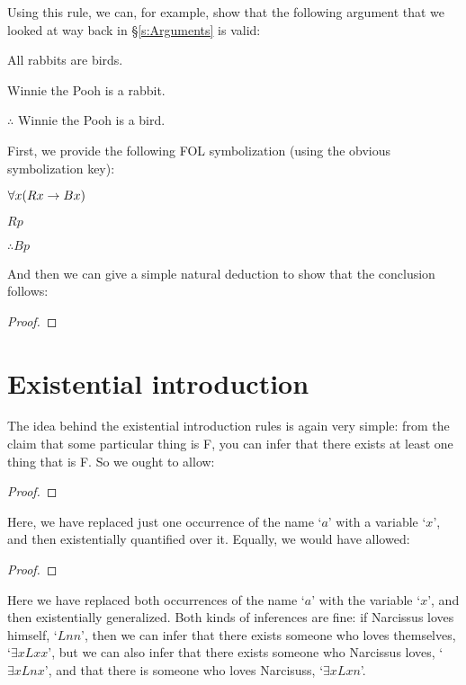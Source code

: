 Using this rule, we can, for example, show that the following argument that we looked at way back in \S\ref{s:Arguments} is valid:
\begin{earg}
\item[]All rabbits are birds.
\item[] Winnie the Pooh is a rabbit.
\item[] $\therefore$ Winnie the Pooh is a bird.
\end{earg}
First, we provide the following FOL symbolization (using the obvious symbolization key):
\begin{earg}
\item[]$\forall x(Rx \rightarrow Bx)$
\item[] $Rp$
\item[] $\therefore Bp$
\end{earg}
And then we can give a simple natural deduction to show that the conclusion follows:

\begin{proof}
	 
	 
\end{proof}



\section{Existential introduction}
The idea behind the existential introduction rules is again very simple: from the claim that some particular thing is F, you can infer that there exists at least one thing that is F. So we ought to allow:
\begin{proof}
	 
\end{proof}
Here, we have replaced just one occurrence of the name `$a$' with a variable `$x$', and then existentially quantified over it. Equally, we would have allowed:
\begin{proof}
	 
\end{proof}
Here we have replaced both occurrences of the name `$a$' with the variable `$x$', and then existentially generalized. Both kinds of inferences are fine: if Narcissus loves himself, `$Lnn$', then we can infer that there exists someone who loves themselves, `$\exists xLxx$', but we can also infer that there exists someone who Narcissus loves, `$\exists xLnx$', and that there is someone who loves Narcisuss, `$\exists xLxn$'.  

